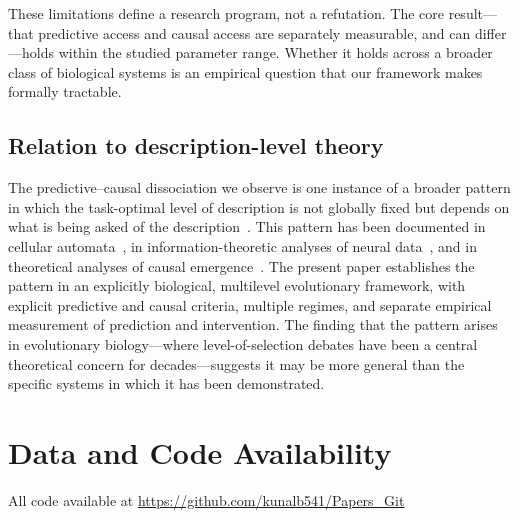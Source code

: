 \documentclass[11pt,a4paper]{article}
\begin{document}
These limitations define a research program, not a refutation.
The core result---that predictive access and causal access are separately
measurable, and can differ---holds within the studied parameter range.
Whether it holds across a broader class of biological systems is an
empirical question that our framework makes formally tractable.

\subsection{Relation to description-level theory}

The predictive--causal dissociation we observe is one instance of a broader
pattern in which the task-optimal level of description is not globally fixed
but depends on what is being asked of the description~\citep{IsraeliGoldenfeld2006,
Hoel2013, Crutchfield2012}.
This pattern has been documented in cellular automata~\citep{IsraeliGoldenfeld2006},
in information-theoretic analyses of neural data~\citep{Krakauer2020},
and in theoretical analyses of causal emergence~\citep{Hoel2013}.
The present paper establishes the pattern in an explicitly biological,
multilevel evolutionary framework, with explicit predictive and causal criteria, multiple
regimes, and separate empirical measurement of prediction and intervention.
The finding that the pattern arises in evolutionary biology---where level-of-selection
debates have been a central theoretical concern for decades---suggests it
may be more general than the specific systems in which it has been demonstrated.

\clearpage



\clearpage

\section*{Data and Code Availability}

All code available at \url{https://github.com/kunalb541/Papers_Git}

\clearpage
\end{document}
